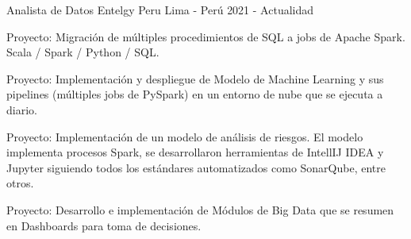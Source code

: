 

\begin{cventries}

  \cventry
  {Analista de Datos} %
  {Entelgy Peru} %
  {Lima - Per\'u} %
  {2021 - Actualidad} %
  {
    \begin{cvitems} %
      \item {Proyecto: Migraci\'on de m\'ultiples procedimientos de SQL a jobs de Apache Spark. Scala / Spark / Python / SQL.}
      \item {Proyecto: Implementaci\'on y despliegue de Modelo de Machine Learning y sus pipelines (m\'ultiples jobs de PySpark) en un entorno de nube que se ejecuta a diario.}
      \item {Proyecto: Implementaci\'on de un modelo de an\'alisis de riesgos. El modelo implementa procesos Spark, se desarrollaron herramientas de IntellIJ IDEA y Jupyter siguiendo todos los est\'andares automatizados como SonarQube, entre otros.}
      \item {Proyecto: Desarrollo e implementaci\'on de M\'odulos de Big Data que se resumen en Dashboards para toma de decisiones.}
    \end{cvitems}
  }


\end{cventries}
